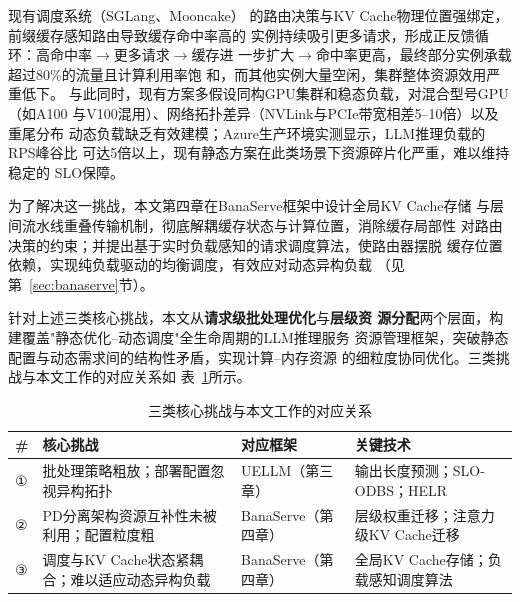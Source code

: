 \begin{enumerate}
现有调度系统（SGLang\cite{zheng2024sglang}、Mooncake\cite{qin2024mooncake}）
的路由决策与KV Cache物理位置强绑定，前缀缓存感知路由导致缓存命中率高的
实例持续吸引更多请求，形成正反馈循环：高命中率$\to$更多请求$\to$缓存进
一步扩大$\to$命中率更高，最终部分实例承载超过80\%的流量且计算利用率饱
和，而其他实例大量空闲，集群整体资源效用严重低下\cite{he2025banaserve}。
与此同时，现有方案多假设同构GPU集群和稳态负载，对混合型号GPU（如A100
与V100混用）、网络拓扑差异（NVLink与PCIe带宽相差5--10倍）以及重尾分布
动态负载缺乏有效建模；Azure生产环境实测显示，LLM推理负载的RPS峰谷比
可达5倍以上，现有静态方案在此类场景下资源碎片化严重，难以维持稳定的
SLO保障。

为了解决这一挑战，本文第四章在BanaServe框架中设计全局KV Cache存储
与层间流水线重叠传输机制，彻底解耦缓存状态与计算位置，消除缓存局部性
对路由决策的约束；并提出基于实时负载感知的请求调度算法，使路由器摆脱
缓存位置依赖，实现纯负载驱动的均衡调度，有效应对动态异构负载
（见第~\ref{sec:banaserve}节）。

\end{enumerate}

针对上述三类核心挑战，本文从\textbf{请求级批处理优化}与\textbf{层级资
源分配}两个层面，构建覆盖"静态优化--动态调度"全生命周期的LLM推理服务
资源管理框架，突破静态配置与动态需求间的结构性矛盾，实现计算--内存资源
的细粒度协同优化。三类挑战与本文工作的对应关系如
表~\ref{tab:challenge_work_mapping}所示。

\begin{table}[htbp]
  \centering
  \caption{三类核心挑战与本文工作的对应关系}
  \label{tab:challenge_work_mapping}
  \begin{tabularx}{\textwidth}{p{0.5cm}p{4.5cm}p{3.5cm}p{4.5cm}}
    \toprule
    \textbf{\#} & \textbf{核心挑战} &
    \textbf{对应框架} & \textbf{关键技术} \\
    \midrule
    ① &
    批处理策略粗放；部署配置忽视异构拓扑 &
    UELLM（第三章） &
    输出长度预测；SLO-ODBS；HELR \\
    \midrule
    ② &
    PD分离架构资源互补性未被利用；配置粒度粗 &
    BanaServe（第四章） &
    层级权重迁移；注意力级KV Cache迁移 \\
    \midrule
    ③ &
    调度与KV Cache状态紧耦合；难以适应动态异构负载 &
    BanaServe（第四章） &
    全局KV Cache存储；负载感知调度算法 \\
    \bottomrule
  \end{tabularx}
\end{table}

